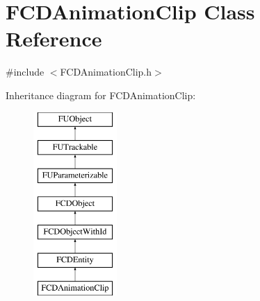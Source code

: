 \hypertarget{classFCDAnimationClip}{
\section{FCDAnimationClip Class Reference}
\label{classFCDAnimationClip}
}


{\ttfamily \#include $<$FCDAnimationClip.h$>$}

Inheritance diagram for FCDAnimationClip:\begin{figure}[H]
\begin{center}
\leavevmode
\includegraphics[height=7.000000cm]{classFCDAnimationClip}
\end{center}
\end{figure}

